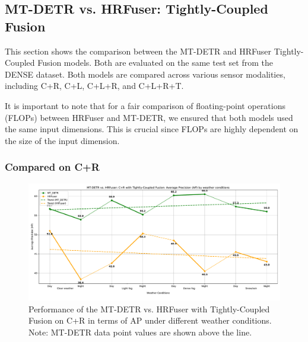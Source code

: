 \documentclass[report.tex]{subfiles}
\begin{document}


    \subsection{MT-DETR vs. HRFuser: Tightly-Coupled Fusion}

    This section shows the comparison between the MT-DETR and HRFuser Tightly-Coupled Fusion models. Both are evaluated on the same test set from the DENSE dataset. Both models are compared across various sensor modalities, including C+R, C+L, C+L+R, and C+L+R+T.

    It is important to note that for a fair comparison of floating-point operations (FLOPs) between HRFuser and MT-DETR, we ensured that both models used the same input dimensions. This is crucial since FLOPs are highly dependent on the size of the input dimension. 

    \FloatBarrier
    \subsubsection{Compared on C+R}

    \begin{figure}[h!]
        \centering
        \includegraphics[width=1.0\textwidth]{images/results/hrfuser_vs_mtdetr/cr/ap.pdf}
        \caption{Performance of the MT-DETR vs. HRFuser with Tightly-Coupled Fusion on C+R in terms of AP under different weather conditions. Note: MT-DETR data point values are shown above the line.}
        \label{fig:hrfuser_vs_mtdetr_cr_ap}
    \end{figure}
\end{document}
